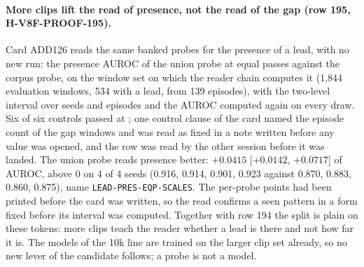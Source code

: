 \paragraph{More clips lift the read of presence, not the read of the gap (row 195, H-V8F-PROOF-195).} Card ADD126 reads the same banked probes for the presence of a lead, with no new run: the presence AUROC of the union probe at equal passes against the corpus probe, on the window set on which the reader chain computes it (1,844 evaluation windows, 534 with a lead, from 139 episodes), with the two-level interval over seeds and episodes and the AUROC computed again on every draw. Six of six controls passed at ; one control clause of the card named the episode count of the gap windows and was read as fixed in a note written before any value was opened, and the row was read by the other session before it was landed. The union probe reads presence better: $+0.0415$ [$+0.0142$, $+0.0717$] of AUROC, above 0 on 4 of 4 seeds (0.916, 0.914, 0.901, 0.923 against 0.870, 0.883, 0.860, 0.875), name \texttt{LEAD-PRES-EQP-SCALES}. The per-probe points had been printed before the card was written, so the read confirms a seen pattern in a form fixed before its interval was computed. Together with row 194 the split is plain on these tokens: more clips teach the reader whether a lead is there and not how far it is. The models of the 10k line are trained on the larger clip set already, so no new lever of the candidate follows; a probe is not a model.
